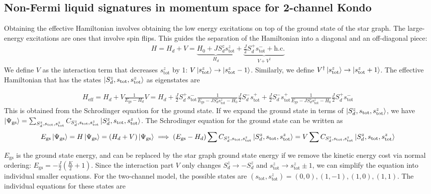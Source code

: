 \documentclass[reprint,prb,superscriptaddress]{revtex4-2}
\begin{document}
\subsection{Non-Fermi liquid signatures in momentum space for 2-channel Kondo}
Obtaining the effective Hamiltonian involves obtaining the low energy excitations on top of the ground state of the star graph. The large-energy excitations are ones that involve spin flips. This guides the separation of the Hamiltonian into a diagonal and an off-diagonal piece:
\begin{align}
	H = H_d + V = \underbrace{H_0 + J S_d^z s_\text{tot}^z}_{H_d} + \underbrace{\frac{J}{2}S_d^+ s_\text{tot}^- + \text{h.c.}}_{V + V^\dagger}
\end{align}
We define \(V\) as the interaction term that decreases \(s_\text{tot}^z\) by 1: \(V \ket{s_\text{tot}^z} \to \ket{s_\text{tot}^z - 1}\). Similarly, we define \(V^\dagger \ket{s_\text{tot}^z} \to \ket{s_\text{tot}^z + 1}\). The effective Hamiltonian that has the states \(\ket{S_d^z, s_\text{tot}, s_\text{tot}^z}\) as eigenstates are
\begin{widetext}
\begin{align}
	H_\text{eff} = H_d + V \frac{1}{E_\text{gs} - H_d}V = H_d + \frac{J}{2}S_d^+ s_\text{tot}^- \frac{1}{E_\text{gs} - J S_d^z s_\text{tot}^z - H_0}\frac{J}{2}S_d^- s_\text{tot}^+ +\frac{J}{2}S_d^- s_\text{tot}^+ \frac{1}{E_\text{gs} - J S_d^z s_\text{tot}^z - H_0}\frac{J}{2}S_d^+ s_\text{tot}^-
\end{align}
This is obtained from the Schrodinger equation for the ground state. If we expand the ground state in terms of \(\ket{S_d^z, s_\text{tot}, s_\text{tot}^z}\), we have  \(\ket{\Psi_\text{gs}} = \sum_{S_d^z, s_\text{tot},s_\text{tot}^z}C_{S_d^z, s_\text{tot},s_\text{tot}^z}\ket{S_d^z, s_\text{tot}, s_\text{tot}^z}\). The Schrodinger equation for the ground state can be written as
\begin{align}
	E_\text{gs}\ket{\Psi_\text{gs}} = H \ket{\Psi_\text{gs}} = \left(H_d + V\right)\ket{\Psi_\text{gs}} \implies \left(E_\text{gs} - H_d\right)\sum C_{S_d^z, s_\text{tot},s_\text{tot}^z}\ket{S_d^z, s_\text{tot}, s_\text{tot}^z} = V\sum C_{S_d^z, s_\text{tot},s_\text{tot}^z}\ket{S_d^z, s_\text{tot}, s_\text{tot}^z}
\end{align}
\end{widetext}
\(E_\text{gs}\) is the ground state energy, and can be replaced by the star graph ground state energy if we remove the kinetic energy cost via normal ordering: \(E_\text{gs} = -\frac{J}{2}\left(\frac{K}{2}+1\right) \). Since the interaction part \(V\) only changes \(S_d^z \to -S_d^z\) and \(s^z_\text{tot} \to s^z_\text{tot} \pm 1\), we can simplify the equation into individual smaller equations. For the two-channel model, the possible states are \((s_\text{tot},s^z_\text{tot}) = (0,0), (1,-1), (1,0), (1,1)\). The individual equations for these states are
\end{document}
